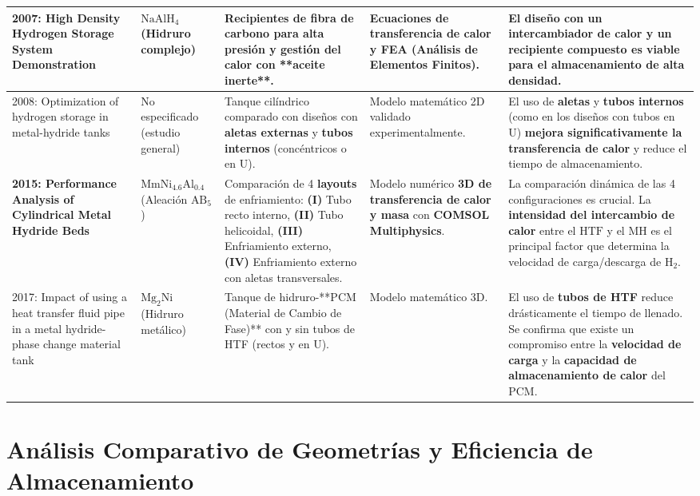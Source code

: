 \documentclass{article}
\begin{document}
\begin{table}[!ht]
\begin{tabular}{>{\raggedright}m{2.5cm}|>{\raggedright}m{2.5cm}|>{\raggedright}m{3.5cm}|>{\raggedright}m{2.5cm}|>{\raggedright\arraybackslash}m{4cm}}
2007: High Density Hydrogen Storage System Demonstration & $\text{NaAlH}_4$ (Hidruro complejo) & Recipientes de \textbf{fibra de carbono} para alta presión y gestión del calor con **aceite inerte**. & Ecuaciones de transferencia de calor y FEA (Análisis de Elementos Finitos). & El diseño con un \textbf{intercambiador de calor} y un recipiente compuesto es viable para el \textbf{almacenamiento de alta densidad}. \\
\midrule
2008: Optimization of hydrogen storage in metal-hydride tanks & No especificado (estudio general) & Tanque cilíndrico comparado con diseños con \textbf{aletas externas} y \textbf{tubos internos} (concéntricos o en U). & Modelo matemático 2D validado experimentalmente. & El uso de \textbf{aletas} y \textbf{tubos internos} (como en los diseños con tubos en U) \textbf{mejora significativamente la transferencia de calor} y reduce el tiempo de almacenamiento. \\
\midrule
\textbf{2015: Performance Analysis of Cylindrical Metal Hydride Beds} & $\text{MmNi}_{4.6}\text{Al}_{0.4}$ (Aleación $\text{AB}_5$) & Comparación de 4 \textbf{layouts} de enfriamiento: \textbf{(I)} Tubo recto interno, \textbf{(II)} Tubo helicoidal, \textbf{(III)} Enfriamiento externo, \textbf{(IV)} Enfriamiento externo con aletas transversales. & Modelo numérico \textbf{3D de transferencia de calor y masa} con \textbf{COMSOL Multiphysics}. & La comparación dinámica de las 4 configuraciones es crucial. La \textbf{intensidad del intercambio de calor} entre el $\text{HTF}$ y el $\text{MH}$ es el principal factor que determina la velocidad de carga/descarga de $\text{H}_2$. \\
\midrule
2017: Impact of using a heat transfer fluid pipe in a metal hydride-phase change material tank & $\text{Mg}_2\text{Ni}$ (Hidruro metálico) & Tanque de hidruro-**PCM (Material de Cambio de Fase)** con y sin tubos de HTF (rectos y en U). & Modelo matemático 3D. & El uso de \textbf{tubos de HTF} reduce drásticamente el tiempo de llenado. Se confirma que existe un compromiso entre la \textbf{velocidad de carga} y la \textbf{capacidad de almacenamiento de calor} del $\text{PCM}$. \\
\bottomrule
\end{tabular}
\end{table}

\section{Análisis Comparativo de Geometrías y Eficiencia de Almacenamiento}
\end{document}

